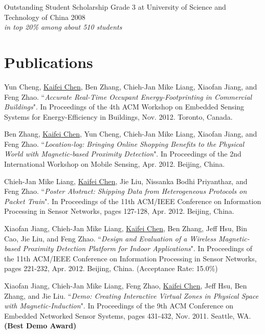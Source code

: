 \documentclass[margin,line]{res}
\begin{document}
\begin{resume}
      \vspace*{-2.5mm}
      Outstanding Student Scholarship Grade 3 at University of Science and Technology of China \hfill 2008\\
      {\it in top 20\% among about 510 students}


    \section{\sc Publications}
      Yun Cheng, \underline{Kaifei Chen}, Ben Zhang, Chieh-Jan Mike Liang, Xiaofan Jiang, and Feng Zhao. ``{\it Accurate Real-Time Occupant Energy-Footprinting in Commercial Buildings}". In Proceedings of the 4th ACM Workshop on Embedded Sensing Systems for Energy-Efficiency in Buildings, Nov. 2012. Toronto, Canada.

      \vspace*{-2.0mm}
      Ben Zhang, \underline{Kaifei Chen}, Yun Cheng, Chieh-Jan Mike Liang, Xiaofan Jiang, and Feng Zhao. ``{\it Location-log: Bringing Online Shopping Benefits to the Physical World with Magnetic-based Proximity Detection}". In Proceedings of the 2nd International Workshop on Mobile Sensing, Apr. 2012. Beijing, China.

      \vspace*{-2.0mm}
      Chieh-Jan Mike Liang, \underline{Kaifei Chen}, Jie Liu, Nissanka Bodhi Priyanthaz, and Feng Zhao. ``{\it Poster Abstract: Shipping Data from Heterogeneous Protocols on Packet Train}". In Proceedings of the 11th ACM/IEEE Conference on Information Processing in Sensor Networks, pages 127-128, Apr. 2012. Beijing, China.

      \vspace*{-2.0mm}
      Xiaofan Jiang, Chieh-Jan Mike Liang, \underline{Kaifei Chen}, Ben Zhang, Jeff Hsu, Bin Cao, Jie Liu, and Feng Zhao. ``{\it Design and Evaluation of a Wireless Magnetic-based Proximity Detection Platform for Indoor Applications}". In Proceedings of the 11th ACM/IEEE Conference on Information Processing in Sensor Networks, pages 221-232, Apr. 2012. Beijing, China. (Acceptance Rate: 15.0\%)

      \vspace*{-2.0mm}
      Xiaofan Jiang, Chieh-Jan Mike Liang, Feng Zhao, \underline{Kaifei Chen}, Jeff Hsu, Ben Zhang, and Jie Liu. ``{\it Demo: Creating Interactive Virtual Zones in Physical Space with Magnetic-Induction}". In Proceedings of the 9th ACM Conference on Embedded Networked Sensor Systems, pages 431-432, Nov. 2011. Seattle, WA. {\bf (Best Demo Award)}


\end{resume}
\end{document}
